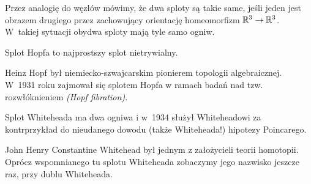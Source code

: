 Przez analogię do węzłów mówimy, że dwa sploty są takie same, jeśli jeden jest obrazem drugiego przez zachowujący orientację homeomorfizm $\mathbb R^3 \to \mathbb R^3$.
W~takiej sytuacji obydwa sploty mają tyle samo ogniw.

\begin{example}
%
%
    Splot Hopfa to najprostszy splot nietrywialny.
\end{example}

\begin{remark}
    Heinz Hopf był niemiecko-szwajcarskim pionierem topologii algebraicznej. W~1931 roku zajmował się splotem Hopfa w ramach badań nad tzw. rozwłóknieniem \emph{(Hopf fibration)}.
\end{remark}

\begin{example}
%
%
    Splot Whiteheada ma dwa ogniwa i w~1934 służył Whiteheadowi za kontrprzykład do nieudanego dowodu (także Whiteheada!) hipotezy Poincarego.
\end{example}

\begin{remark}
    John Henry Constantine Whitehead był jednym z założycieli teorii homotopii. Oprócz wspomnianego tu splotu Whiteheada zobaczymy jego nazwisko jeszcze raz, przy dublu Whiteheada.
\end{remark}

